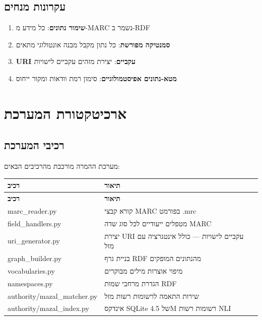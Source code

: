\documentclass[12pt,a4paper]{article}
\newcommand{\new}[1]{\textcolor{newaddition}{#1}}
\begin{document}
\subsection{עקרונות מנחים}

\begin{enumerate}
\item \textbf{שימור נתונים}: כל מידע מ-MARC נשמר ב-RDF
\item \textbf{סמנטיקה מפורשת}: כל נתון מקבל מבנה אונטולוגי מתאים
\item \textbf{URI עקביים}: יצירת מזהים עקביים לישויות
\item \textbf{מטא-נתונים אפיסטמולוגיים}: סימון רמת וודאות ומקור ייחוס
\end{enumerate}

\newpage
\section{ארכיטקטורת המערכת}

\subsection{רכיבי המערכת}

מערכת ההמרה מורכבת מהרכיבים הבאים:

\begin{longtable}{|L{5cm}|p{11cm}|}
\hline
\textbf{רכיב} & \textbf{תיאור} \\
\hline
\endfirsthead
\hline
\textbf{רכיב} & \textbf{תיאור} \\
\hline
\endhead
\hline
\endfoot
marc\_reader.py & קורא קבצי MARC בפורמט .mrc \\
\hline
field\_handlers.py & מטפלים ייעודיים לכל סוג שדה MARC \\
\hline
uri\_generator.py & יצירת URI עקביים לישויות \new{— כולל אינטגרציה עם מזל} \\
\hline
graph\_builder.py & בניית גרף RDF מהנתונים המופקים \\
\hline
vocabularies.py & מיפוי אוצרות מילים מבוקרים \\
\hline
namespaces.py & הגדרת מרחבי שמות RDF \\
\hline
\new{authority/mazal\_matcher.py} & \new{שירות התאמה לרשומות רשות מזל} \\
\hline
\new{authority/mazal\_index.py} & \new{אינדקס SQLite של 4.5M רשומות רשות NLI} \\
\hline
\end{longtable}
\end{document}
